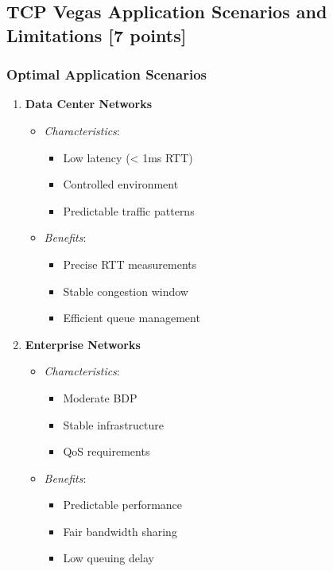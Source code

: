 \documentclass[11pt,a4paper]{article}
\begin{document}
\subsection{TCP Vegas Application Scenarios and Limitations [7 points]}
\begin{tcolorbox}[
    enhanced,
    colback=white,
    colframe=green!75!black,
    title=Deployment Scenarios Analysis]

\subsubsection{Optimal Application Scenarios}
\begin{enumerate}
    \item \textbf{Data Center Networks}
    \begin{itemize}
        \item \textit{Characteristics}:
        \begin{itemize}
            \item Low latency (< 1ms RTT)
            \item Controlled environment
            \item Predictable traffic patterns
        \end{itemize}
        \item \textit{Benefits}:
        \begin{itemize}
            \item Precise RTT measurements
            \item Stable congestion window
            \item Efficient queue management
        \end{itemize}
    \end{itemize}

    \item \textbf{Enterprise Networks}
    \begin{itemize}
        \item \textit{Characteristics}:
        \begin{itemize}
            \item Moderate BDP
            \item Stable infrastructure
            \item QoS requirements
        \end{itemize}
        \item \textit{Benefits}:
        \begin{itemize}
            \item Predictable performance
            \item Fair bandwidth sharing
            \item Low queuing delay
        \end{itemize}
    \end{itemize}


\end{enumerate}
\end{tcolorbox}
\end{document}
